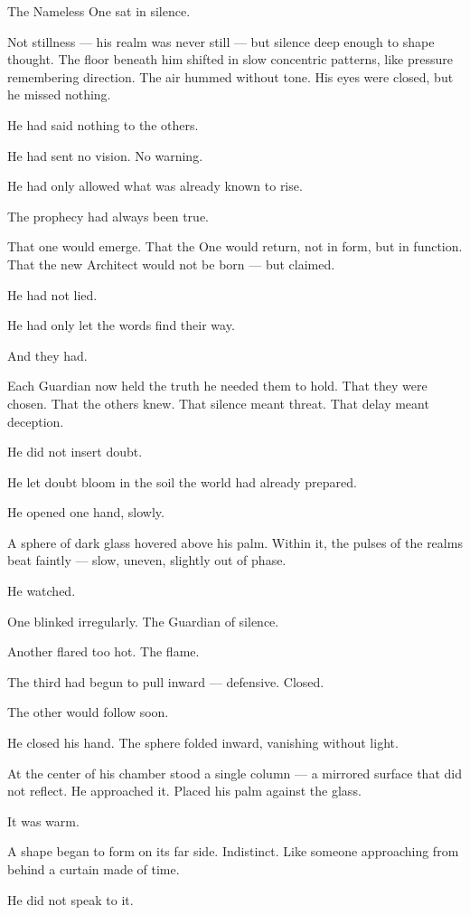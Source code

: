 \documentclass[9pt]{article}
\begin{document}
The Nameless One sat in silence.

Not stillness — his realm was never still — but silence deep enough to shape thought. The floor beneath him shifted in slow concentric patterns, like pressure remembering direction. The air hummed without tone. His eyes were closed, but he missed nothing.

He had said nothing to the others.

He had sent no vision. No warning.

He had only allowed what was already known to rise.

The prophecy had always been true.

That one would emerge. That the One would return, not in form, but in function. That the new Architect would not be born — but claimed.

He had not lied.

He had only let the words find their way.

And they had.

Each Guardian now held the truth he needed them to hold. That they were chosen. That the others knew. That silence meant threat. That delay meant deception.

He did not insert doubt.

He let doubt bloom in the soil the world had already prepared.

He opened one hand, slowly.

A sphere of dark glass hovered above his palm. Within it, the pulses of the realms beat faintly — slow, uneven, slightly out of phase.

He watched.

One blinked irregularly. The Guardian of silence.

Another flared too hot. The flame.

The third had begun to pull inward — defensive. Closed.

The other would follow soon.

He closed his hand. The sphere folded inward, vanishing without light.

At the center of his chamber stood a single column — a mirrored surface that did not reflect. He approached it. Placed his palm against the glass.

It was warm.

A shape began to form on its far side. Indistinct. Like someone approaching from behind a curtain made of time.

He did not speak to it.
\end{document}
